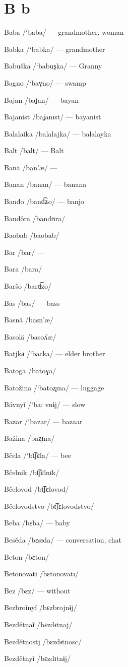 \chapter{B b}

Baba /`baba/ — grandmother, woman

Babka /`babka/ — grandmother

Babuška /`babuʂka/ — Granny

Bagno /`baɣno/ — swamp

Bajan /baʝan/ — bayan

Bajanist /baʝanɪst/ — bayanist

Balalaǐka /balalajka/ — balalayka

Balt /balt/ — Balt

Banä /ban’æ/ —

Banan /banan/ — banana

Banđo /band͡ʑo/ — banjo

Bandôra /bandʊra/

Baobab /baobab/

Bar /bar/ —

Bara /bara/

Barŝo /bard͡zo/

Bas /bas/ — bass

Basnä /basn’æ/

Basolä /basoʎæ/

Batjkа /`backa/ — elder brother

Batoga /batoɣa/

Batožina /`batoʐɪna/ — luggage

Bávnyǐ /`ba: vnɨj/ — slow

Bazar /`bazar/ — bazaar

Bažina /baʐɪna/

Bčela /`bt͡ʃɛla/ — bee

Bčelnik /bt͡ʃɛlnɪk/

Bčelovod /bt͡ʃɛlovod/

Bčelovodstvo /bt͡ʃɛlovodstvo/

Beba /bɛba/ — baby

Besěda /bɛsᵻda/ — conversation, chat

Beton /bɛton/

Betonovati /bɛtonovatɪ/

Bez /bɛz/ — without

Bezbroǐnyǐ /bɛzbrojnɨj/

Bezdětnaǐ /bɛzdᵻtnaj/

Bezdětnostj /bɛzdᵻtnosc/

Bezdětnyǐ /bɛzdᵻtnɨj/

